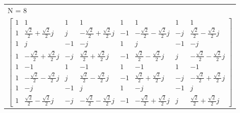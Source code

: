 		\begin{tabular}{l }
        N = 8\\
 		$\begin{bmatrix}
		1 & 1 & 1 & 1 & 1 & 1 & 1 & 1\\ 
		1 & \frac{\sqrt{2}}{2}+\frac{\sqrt{2}}{2}j & j &
		-\frac{\sqrt{2}}{2}+\frac{\sqrt{2}}{2}j & -1 & 
		-\frac{\sqrt{2}}{2}-\frac{\sqrt{2}}{2}j & -j & 
		\frac{\sqrt{2}}{2}-\frac{\sqrt{2}}{2}j\\
		1 & j & -1 & -j & 1 & j & -1 & -j\\
		1 &	-\frac{\sqrt{2}}{2}+\frac{\sqrt{2}}{2}j & -j & 
		\frac{\sqrt{2}}{2}+\frac{\sqrt{2}}{2}j & -1 & 
		\frac{\sqrt{2}}{2}-\frac{\sqrt{2}}{2}j & j &
		-\frac{\sqrt{2}}{2}-\frac{\sqrt{2}}{2}j\\
		1 & -1 & 1 & -1 & 1 & -1 & 1 & -1\\
		1 &	-\frac{\sqrt{2}}{2}-\frac{\sqrt{2}}{2}j & j &
		\frac{\sqrt{2}}{2}-\frac{\sqrt{2}}{2}j & -1 &
		\frac{\sqrt{2}}{2}+\frac{\sqrt{2}}{2}j & -j &
		-\frac{\sqrt{2}}{2}+\frac{\sqrt{2}}{2}j\\
		1 & -j & -1 & j & 1 & -j & -1 & j\\
		1 &	\frac{\sqrt{2}}{2}-\frac{\sqrt{2}}{2}j & -j & 
		-\frac{\sqrt{2}}{2}-\frac{\sqrt{2}}{2}j & -1 &
		-\frac{\sqrt{2}}{2}+\frac{\sqrt{2}}{2}j & j &
		\frac{\sqrt{2}}{2}+\frac{\sqrt{2}}{2}j
		\end{bmatrix}$
		\end{tabular}


	
	
	
	